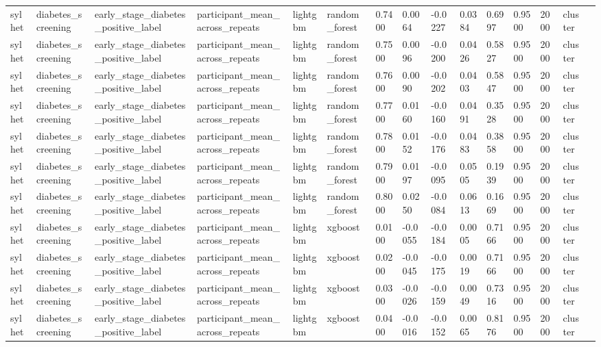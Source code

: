 \begin{tabular}{lllllllllllllll}
sylhet & diabetes\_screening & early\_stage\_diabetes\_positive\_label & participant\_mean\_across\_repeats & lightgbm & random\_forest & 0.7400 & 0.0064 & -0.0227 & 0.0384 & 0.6997 & 0.9500 & 2000 & cluster &  \\
sylhet & diabetes\_screening & early\_stage\_diabetes\_positive\_label & participant\_mean\_across\_repeats & lightgbm & random\_forest & 0.7500 & 0.0096 & -0.0200 & 0.0426 & 0.5827 & 0.9500 & 2000 & cluster &  \\
sylhet & diabetes\_screening & early\_stage\_diabetes\_positive\_label & participant\_mean\_across\_repeats & lightgbm & random\_forest & 0.7600 & 0.0090 & -0.0202 & 0.0403 & 0.5847 & 0.9500 & 2000 & cluster &  \\
sylhet & diabetes\_screening & early\_stage\_diabetes\_positive\_label & participant\_mean\_across\_repeats & lightgbm & random\_forest & 0.7700 & 0.0160 & -0.0160 & 0.0491 & 0.3528 & 0.9500 & 2000 & cluster &  \\
sylhet & diabetes\_screening & early\_stage\_diabetes\_positive\_label & participant\_mean\_across\_repeats & lightgbm & random\_forest & 0.7800 & 0.0152 & -0.0176 & 0.0483 & 0.3858 & 0.9500 & 2000 & cluster &  \\
sylhet & diabetes\_screening & early\_stage\_diabetes\_positive\_label & participant\_mean\_across\_repeats & lightgbm & random\_forest & 0.7900 & 0.0197 & -0.0095 & 0.0505 & 0.1939 & 0.9500 & 2000 & cluster &  \\
sylhet & diabetes\_screening & early\_stage\_diabetes\_positive\_label & participant\_mean\_across\_repeats & lightgbm & random\_forest & 0.8000 & 0.0250 & -0.0084 & 0.0613 & 0.1669 & 0.9500 & 2000 & cluster &  \\
sylhet & diabetes\_screening & early\_stage\_diabetes\_positive\_label & participant\_mean\_across\_repeats & lightgbm & xgboost & 0.0100 & -0.0055 & -0.0184 & 0.0005 & 0.7166 & 0.9500 & 2000 & cluster &  \\
sylhet & diabetes\_screening & early\_stage\_diabetes\_positive\_label & participant\_mean\_across\_repeats & lightgbm & xgboost & 0.0200 & -0.0045 & -0.0175 & 0.0019 & 0.7166 & 0.9500 & 2000 & cluster &  \\
sylhet & diabetes\_screening & early\_stage\_diabetes\_positive\_label & participant\_mean\_across\_repeats & lightgbm & xgboost & 0.0300 & -0.0026 & -0.0159 & 0.0049 & 0.7316 & 0.9500 & 2000 & cluster &  \\
sylhet & diabetes\_screening & early\_stage\_diabetes\_positive\_label & participant\_mean\_across\_repeats & lightgbm & xgboost & 0.0400 & -0.0016 & -0.0152 & 0.0065 & 0.8176 & 0.9500 & 2000 & cluster &  \\

\end{tabular}
